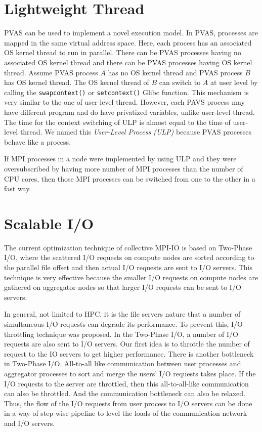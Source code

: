 \section{Lightweight Thread}

PVAS can be used to implement a novel execution model. In PVAS,
processes are mapped in the same virtual address space. Here, each
process has an associated OS kernel thread to run in parallel. There
can be PVAS processes having no associated OS kernel thread and there
can be PVAS processes having OS kernel thread. Assume PVAS process $A$
has no OS kernel thread and PVAS process $B$ has OS kernel thread. The
OS kernel thread of $B$ can switch to $A$ at user level by calling
the {\tt swapcontext()} or {\tt setcontext()} Glibc function. This
mechanism is very similar to the one of user-level thread. However,
each PAVS process may have different program and do have privatized
variables, unlike user-level thread. The time for the context
switching of ULP is almost equal to the time of user-level thread. 
We named this {\em User-Level Process (ULP)}
because PVAS processes behave like a process\cite{110009850784}.

If MPI processes in a node were implemented by using ULP and they were
oversubscribed by having more number of MPI processes than the number
of CPU cores, then those MPI processes can be switched from one to
the other in a fast way. 

\section{Scalable I/O}

The current optimization technique of collective MPI-IO\cite{romio} is
based on Two-Phase I/O\cite{two-phase}, where the scattered I/O
requests on compute nodes are 
sorted according to the parallel file offset and then actual I/O
requests are sent to I/O servers. This technique is very effective
because the smaller I/O requests on compute nodes are gathered on
aggregator nodes so that larger I/O requests can be sent to I/O
servers. 

In general, not limited to HPC, it is the file servers nature that a
number of simultaneous I/O requests can degrade its performance. To
prevent this, I/O throttling technique was proposed. In the Two-Phase
I/O, a number of I/O requests are also sent to I/O servers. Our first
idea is to throttle the number of request to the IO servers to get
higher performance. There is another bottleneck in Two-Phase
I/O. All-to-all like communication between user processes and
aggregator processes to sort and merge the users' I/O requests takes
place. If the I/O requests to the server are throttled, then this
all-to-all-like communication can also be throttled. And the
communication bottleneck can also be relaxed. Thus, the flow 
of the I/O requests from user process to I/O servers can be done in a
way of step-wise pipeline to level the loads of the communication
network and I/O servers.

